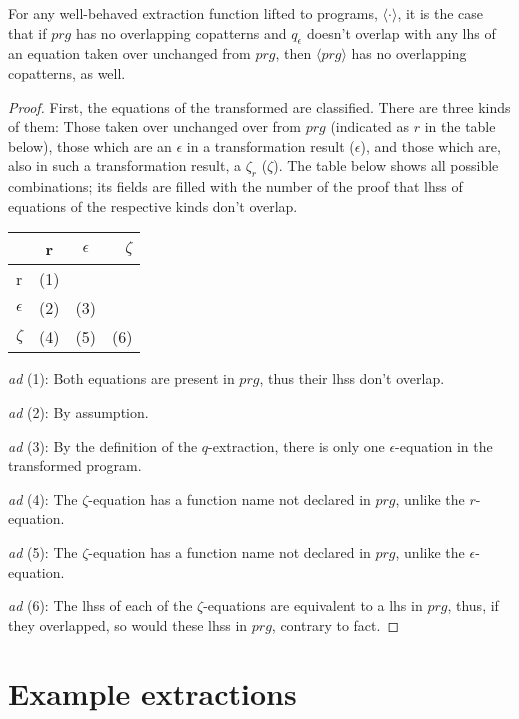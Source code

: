 \begin{proposition}
For any well-behaved extraction function lifted to programs, $\langle \cdot \rangle$, it is the case that if $prg$ has no overlapping copatterns and $q_\epsilon$ doesn't overlap with any lhs of an equation taken over unchanged from $prg$, then $\langle prg \rangle$ has no overlapping copatterns, as well.

\begin{proof}
First, the equations of the transformed are classified. There are three kinds of them: Those taken over unchanged over from $prg$ (indicated as $r$ in the table below), those which are an $\epsilon$ in a transformation result ($\epsilon$), and those which are, also in such a transformation result, a $\zeta_r$ ($\zeta$). The table below shows all possible combinations; its fields are filled with the number of the proof that lhss of equations of the respective kinds don't overlap.

\begin{tabular}{ l | c | c | r }  & r & $\epsilon$ & $\zeta$ \\ \hline r & (1) &  &  \\ \hline $\epsilon$ & (2) & (3) &  \\ \hline $\zeta$ & (4) & (5) & (6) \\ \hline \end{tabular}

\textit{ad} (1): Both equations are present in $prg$, thus their lhss don't overlap.

\textit{ad} (2): By assumption.

\textit{ad} (3): By the definition of the $q$-extraction, there is only one $\epsilon$-equation in the transformed program.

\textit{ad} (4): The $\zeta$-equation has a function name not declared in $prg$, unlike the $r$-equation.

\textit{ad} (5): The $\zeta$-equation has a function name not declared in $prg$, unlike the $\epsilon$-equation.

\textit{ad} (6): The lhss of each of the $\zeta$-equations are equivalent to a lhs in $prg$, thus, if they overlapped, so would these lhss in $prg$, contrary to fact.
\end{proof}
\end{proposition}

\section{Example extractions}

